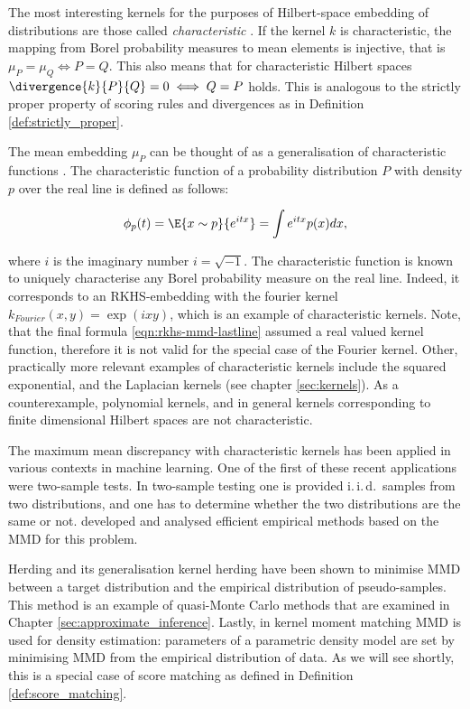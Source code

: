 The most interesting kernels for the purposes of Hilbert-space embedding of distributions are those called \emph{characteristic} \citep{Sriperumbudur2008}. If the kernel $k$ is characteristic, the mapping from Borel probability measures to mean elements is injective, that is $\mu_P = \mu_Q \iff P = Q$. This also means that for characteristic Hilbert spaces $\divergence{k}{P}{Q} = 0 \iff Q=P$ holds. This is analogous to the strictly proper property of scoring rules and divergences as in Definition \ref{def:strictly_proper}.

The mean embedding $\mu_P$ can be thought of as a generalisation of characteristic functions \citep[see \eg][]{Ord1999}. The characteristic function of a probability distribution $P$ with density $p$ over the real line is defined as follows:

\begin{equation}
\phi_p(t) = \E{x\sim p}{e^{ i t x}} = \int e^{i t x} p(x) dx,
\end{equation}

where $i$ is the imaginary number $i=\sqrt{-1}$. The characteristic function is known to uniquely characterise any Borel probability measure on the real line. Indeed, it corresponds to an RKHS-embedding with the fourier kernel $k_{Fourier}(x,y) = \exp(ixy)$, which is an example of characteristic kernels. Note, that the final formula \eqref{eqn:rkhs-mmd-lastline} assumed a real valued kernel function, therefore it is not valid for the special case of the Fourier kernel. Other, practically more relevant examples of characteristic kernels include the squared exponential, and the Laplacian kernels (see chapter \ref{sec:kernels}).  As a counterexample, polynomial kernels, and in general kernels corresponding to finite dimensional Hilbert spaces are not characteristic.

The maximum mean discrepancy with characteristic kernels has been applied in various contexts in machine learning. One of the first of these recent applications were two-sample tests. In two-sample testing one is provided i.\,i.\,d.\ samples from two distributions, and one has to determine whether the two distributions are the same or not. \citet{Gretton2012} developed and analysed efficient empirical methods based on the MMD for this problem.

Herding \citep{welling2009herding} and its generalisation kernel herding \citep{Chen2012} have been shown to minimise MMD between a target distribution and the empirical distribution of pseudo-samples. This method is an example of quasi-Monte Carlo methods that are examined in Chapter \ref{sec:approximate_inference}. Lastly, in kernel moment matching \citep{Song2008} MMD is used for density estimation: parameters of a parametric density model are set by minimising MMD from the empirical distribution of data. As we will see shortly, this is a special case of score matching as defined in Definition \ref{def:score_matching}.

